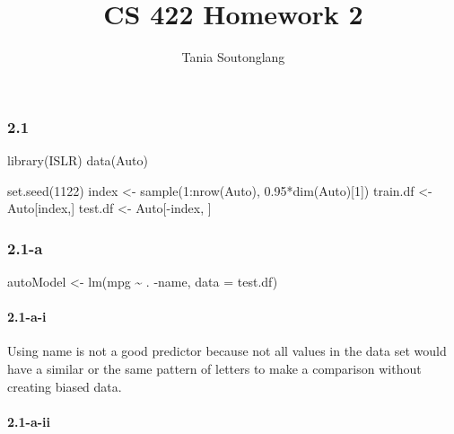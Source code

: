 \documentclass[
]{article}
\title{CS 422 Homework 2}
\author{Tania Soutonglang}
\date{}
\newenvironment{Shaded}{\begin{snugshade}}{\end{snugshade}}
\newcommand{\AttributeTok}[1]{\textcolor[rgb]{0.77,0.63,0.00}{#1}}
\newcommand{\DecValTok}[1]{\textcolor[rgb]{0.00,0.00,0.81}{#1}}
\newcommand{\FloatTok}[1]{\textcolor[rgb]{0.00,0.00,0.81}{#1}}
\newcommand{\FunctionTok}[1]{\textcolor[rgb]{0.00,0.00,0.00}{#1}}
\newcommand{\NormalTok}[1]{#1}
\newcommand{\OtherTok}[1]{\textcolor[rgb]{0.56,0.35,0.01}{#1}}
\newcommand{\SpecialCharTok}[1]{\textcolor[rgb]{0.00,0.00,0.00}{#1}}
\begin{document}
\maketitle

{
\setcounter{tocdepth}{2}
\tableofcontents
}
\hypertarget{section}{%
\subsubsection{2.1}\label{section}}

\begin{Shaded}
\begin{Highlighting}[]
\FunctionTok{library}\NormalTok{(ISLR)}
\FunctionTok{data}\NormalTok{(Auto)}

\FunctionTok{set.seed}\NormalTok{(}\DecValTok{1122}\NormalTok{)}
\NormalTok{index }\OtherTok{\textless{}{-}} \FunctionTok{sample}\NormalTok{(}\DecValTok{1}\SpecialCharTok{:}\FunctionTok{nrow}\NormalTok{(Auto), }\FloatTok{0.95}\SpecialCharTok{*}\FunctionTok{dim}\NormalTok{(Auto)[}\DecValTok{1}\NormalTok{])}
\NormalTok{train.df }\OtherTok{\textless{}{-}}\NormalTok{ Auto[index,]}
\NormalTok{test.df }\OtherTok{\textless{}{-}}\NormalTok{ Auto[}\SpecialCharTok{{-}}\NormalTok{index, ]}
\end{Highlighting}
\end{Shaded}

\hypertarget{a}{%
\subsubsection{2.1-a}\label{a}}

\begin{Shaded}
\begin{Highlighting}[]
\NormalTok{autoModel }\OtherTok{\textless{}{-}} \FunctionTok{lm}\NormalTok{(mpg }\SpecialCharTok{\textasciitilde{}}\NormalTok{ . }\SpecialCharTok{{-}}\NormalTok{name, }\AttributeTok{data =}\NormalTok{ test.df)}
\end{Highlighting}
\end{Shaded}

\hypertarget{a-i}{%
\paragraph{2.1-a-i}\label{a-i}}

Using name is not a good predictor because not all values in the data
set would have a similar or the same pattern of letters to make a
comparison without creating biased data.

\hypertarget{a-ii}{%
\paragraph{2.1-a-ii}\label{a-ii}}
\end{document}
